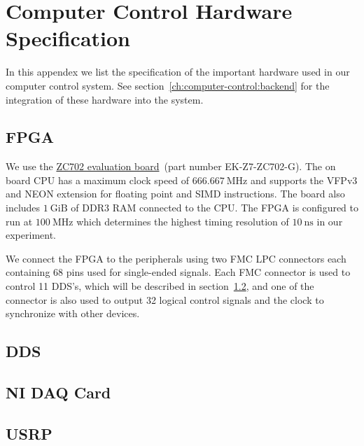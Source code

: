 
\chapter{Computer Control Hardware Specification}
\label{appendex:computer-control}

In this appendex we list the specification of the important hardware
used in our computer control system.
See section~\ref{ch:computer-control:backend} for the integration
of these hardware into the system.

\section{FPGA}
\label{appendex:computer-control:fpga}

We use the \href{https://www.xilinx.com/products/boards-and-kits/ek-z7-zc702-g.html}{ZC702 evaluation board}~(part number EK-Z7-ZC702-G).
The on board CPU has a maximum clock speed of $666.667~\mathrm{MHz}$
and supports the VFPv3 and NEON extension for floating point and SIMD instructions.
The board also includes $1~\mathrm{GiB}$ of DDR3 RAM connected to the CPU.
The FPGA is configured to run at $100~\mathrm{MHz}$ which determines
the highest timing resolution of $10~\mathrm{ns}$ in our experiment.

We connect the FPGA to the peripherals using two FMC LPC connectors
each containing 68 pins used for single-ended signals.
Each FMC connector is used to control 11 DDS's,
which will be described in section~\ref{appendex:computer-control:fpga},
and one of the connector is also used to output 32 logical control signals
and the clock to synchronize with other devices.


\section{DDS}
\label{appendex:computer-control:fpga}


\section{NI DAQ Card}


\section{USRP}

